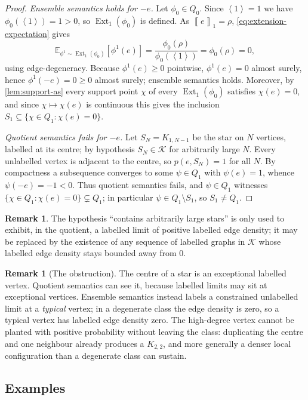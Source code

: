 \documentclass[11pt]{article}
\theoremstyle{definition}
\newtheorem{remark}[theorem]{Remark}
\newcommand{\E}{\mathbb{E}}
\newcommand{\K}{\mathcal{K}}
\newcommand{\Ext}{\operatorname{Ext}}
\newcommand{\brak}[1]{\left\langle #1\right\rangle}
\newcommand{\avg}[2]{\left\llbracket #1 \right\rrbracket_{#2}}
\begin{document}
\begin{proof}
\emph{Ensemble semantics holds for $-e$.}  Let $\phi_0\in Q_0$.  Since $\brak1=1$ we
have $\phi_0(\brak1)=1>0$, so $\Ext_1(\phi_0)$ is defined.  As $\avg{e}{1}=\rho$,
\eqref{eq:extension-expectation} gives
\[
  \E_{\phi^1\sim\Ext_1(\phi_0)}[\phi^1(e)]
  =\frac{\phi_0(\rho)}{\phi_0(\brak1)}=\phi_0(\rho)=0,
\]
using edge-degeneracy.  Because $\phi^1(e)\ge0$ pointwise, $\phi^1(e)=0$ almost
surely, hence $\phi^1(-e)=0\ge0$ almost surely; ensemble semantics holds.  Moreover,
by \cref{lem:support-as} every support point $\chi$ of every $\Ext_1(\phi_0)$
satisfies $\chi(e)=0$, and since $\chi\mapsto\chi(e)$ is continuous this gives the
inclusion $S_1\subseteq\{\chi\in Q_1:\chi(e)=0\}$.

\emph{Quotient semantics fails for $-e$.}  Let $S_N=K_{1,N-1}$ be the star on $N$
vertices, labelled at its centre; by hypothesis $S_N\in\K$ for arbitrarily large $N$.
Every unlabelled vertex is adjacent to the centre, so $p(e,S_N)=1$ for all $N$.  By
compactness a subsequence converges to some $\psi\in Q_1$ with $\psi(e)=1$, whence
$\psi(-e)=-1<0$.  Thus quotient semantics fails, and $\psi\in Q_1$ witnesses
$\{\chi\in Q_1:\chi(e)=0\}\subsetneq Q_1$; in particular $\psi\in Q_1\setminus S_1$,
so $S_1\ne Q_1$.
\end{proof}

\begin{remark}
The hypothesis ``contains arbitrarily large stars'' is only used to exhibit, in the
quotient, a labelled limit of positive labelled edge density; it may be replaced by the
existence of any sequence of labelled graphs in $\K$ whose labelled edge density stays
bounded away from $0$.
\end{remark}

\begin{remark}[The obstruction]
The centre of a star is an exceptional labelled vertex.  Quotient semantics can see
it, because labelled limits may sit at exceptional vertices.  Ensemble semantics
instead labels a constrained unlabelled limit at a \emph{typical} vertex; in a
degenerate class the edge density is zero, so a typical vertex has labelled edge
density zero.  The high-degree vertex cannot be planted with positive probability
without leaving the class: duplicating the centre and one neighbour already produces
a $K_{2,2}$, and more generally a denser local configuration than a degenerate class can
sustain.
\end{remark}

\subsection{Examples}
\end{document}
